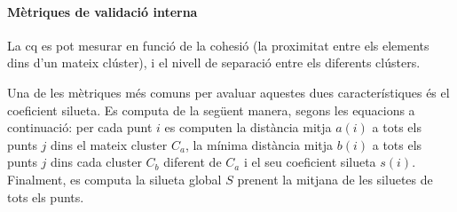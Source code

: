 \documentclass[CAT,BIB]{TFUOC}%
\begin{document}
        \paragraph{Mètriques de validació interna}
            La \gls{cq} es pot mesurar en funció de
            la cohesió
            (la proximitat entre els elements dins d'un mateix clúster),
            i el nivell de separació entre els diferents clústers.

%
%
%


            Una de les mètriques més comuns
            per avaluar aquestes dues característiques
            és el coeficient silueta.
            Es computa de la següent manera,
            segons les equacions a continuació:
            per cada punt $i$ es computen
            la distància mitja $a(i)$ a tots els punts $j$ dins el mateix cluster $C_a$,
            la mínima distància mitja $b(i)$ a tots els punts $j$ dins cada cluster $C_b$ diferent de $C_a$
            i el seu coeficient silueta $s(i)$.
            Finalment, es computa la silueta global $S$
            prenent la mitjana de les siluetes de tots els punts.
\end{document}
